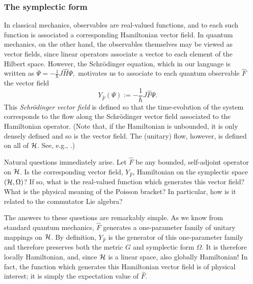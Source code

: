 \documentclass[12pt,aps,eqsecnum,tighten,nofootinbib]{revtex4-2}
\def\be{\begin{equation}}
\def\ee{\end{equation}}
\def\H{{\cal H}}
\def\W{\Omega}
\begin{document}
\subsubsection{The symplectic form}

In classical mechanics, observables are real-valued functions, and to
each such function is associated a corresponding Hamiltonian vector
field.  In quantum mechanics, on the other hand, the observables
themselves may be viewed as vector fields, since linear operators
associate a vector to each element of the Hilbert space.  However, the
Schr\"odinger equation, which in our language is written as $ \dot\Psi
= - \frac{1}{\hbar} J \hat{H} \Psi, $ motivates us to associate to
each quantum observable $\hat{F}$ the vector field 
% 
\be
\label{schrodinger_vf}
      Y_{\hat{F}} (\Psi) := -\frac{1}{\hbar} J \hat{F} \Psi.
\ee
%
This {\em Schr\"odinger vector field} is defined so that the
time-evolution of the system corresponds to the flow along the
Schr\"odinger vector field associated to the Hamiltonian operator.
(Note that, if the Hamiltonian is unbounded, it is only densely
defined and so is the vector field. The (unitary) flow, however, is
defined on all of $\H$. See, e.g., \cite{chernoff_marsden}.)

Natural questions immediately arise.  Let $\hat{F}$ be any bounded,
self-adjoint operator on $\H$.  Is the corresponding vector field,
$Y_{\hat{F}}$, Hamiltonian on the symplectic space $(\H, \Omega)$?  If
so, what is the real-valued function which generates this vector
field?  What is the physical meaning of the Poisson bracket?  In
particular, how is it related to the commutator Lie algebra?

The answers to these questions are remarkably simple.  As we know from
standard quantum mechanics, $\hat{F}$ generates a one-parameter family
of unitary mappings on $\H$.  By definition, $Y_{\hat{F}}$ is the
generator of this one-parameter family and therefore preserves both
the metric $G$ and symplectic form $\W$.  It is therefore locally
Hamiltonian, and, since $\H$ is a linear space, also globally
Hamiltonian!  In fact, the function which generates this Hamiltonian
vector field is of physical interest; it is simply the expectation
value of $\hat{F}$.
\end{document}
